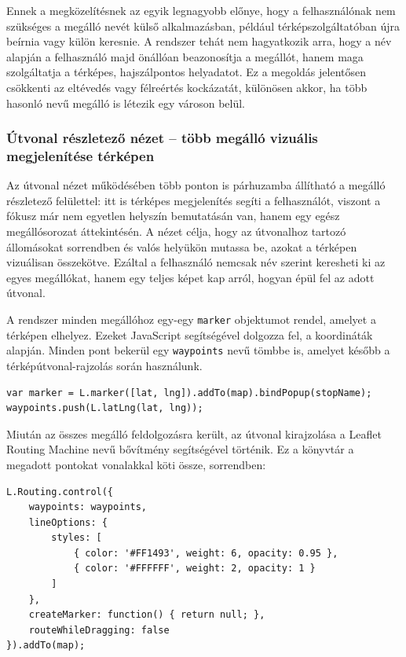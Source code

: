 Ennek a megközelítésnek az egyik legnagyobb előnye, hogy a felhasználónak nem szükséges a megálló nevét külső alkalmazásban, például térképszolgáltatóban újra beírnia vagy külön keresnie. A rendszer tehát nem hagyatkozik arra, hogy a név alapján a felhasználó majd önállóan beazonosítja a megállót, hanem maga szolgáltatja a térképes, hajszálpontos helyadatot. Ez a megoldás jelentősen csökkenti az eltévedés vagy félreértés kockázatát, különösen akkor, ha több hasonló nevű megálló is létezik egy városon belül.

\subsubsection{Útvonal részletező nézet – több megálló vizuális megjelenítése térképen}

Az útvonal nézet működésében több ponton is párhuzamba állítható a megálló részletező felülettel: itt is térképes megjelenítés segíti a felhasználót, viszont a fókusz már nem egyetlen helyszín bemutatásán van, hanem egy egész megállósorozat áttekintésén. A nézet célja, hogy az útvonalhoz tartozó állomásokat sorrendben és valós helyükön mutassa be, azokat a térképen vizuálisan összekötve. Ezáltal a felhasználó nemcsak név szerint keresheti ki az egyes megállókat, hanem egy teljes képet kap arról, hogyan épül fel az adott útvonal.

A rendszer minden megállóhoz egy-egy \texttt{marker} objektumot rendel, amelyet a térképen elhelyez. Ezeket JavaScript segítségével dolgozza fel, a koordináták alapján. Minden pont bekerül egy \texttt{waypoints} nevű tömbbe is, amelyet később a térképútvonal-rajzolás során használunk.

\begin{lstlisting}
var marker = L.marker([lat, lng]).addTo(map).bindPopup(stopName);
waypoints.push(L.latLng(lat, lng));
\end{lstlisting}

Miután az összes megálló feldolgozásra került, az útvonal kirajzolása a Leaflet Routing Machine nevű bővítmény segítségével történik. Ez a könyvtár a megadott pontokat vonalakkal köti össze, sorrendben:

\begin{lstlisting}
L.Routing.control({
    waypoints: waypoints,
    lineOptions: {
        styles: [
            { color: '#FF1493', weight: 6, opacity: 0.95 },
            { color: '#FFFFFF', weight: 2, opacity: 1 }
        ]
    },
    createMarker: function() { return null; },
    routeWhileDragging: false
}).addTo(map);
\end{lstlisting}

